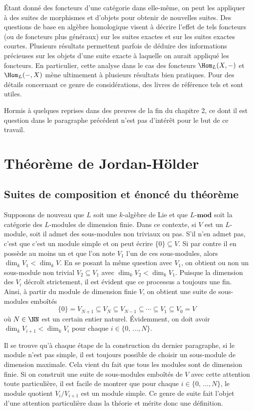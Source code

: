 Étant donné des foncteurs d'une catégorie dans elle-même, on peut les appliquer à des suites de morphismes et d'objets pour obtenir de nouvelles suites. Des questions de base en algèbre homologique visent à décrire l'effet de tels foncteurs (ou de foncteurs plus généraux) sur les suites exactes et sur les suites exactes courtes. Plusieurs résultats permettent parfois de déduire des informations précieuses sur les objets d'une suite exacte à laquelle on aurait appliqué les foncteurs. En particulier, cette analyse dans le cas des foncteurs $\Hom_L(X,-)$ et $\Hom_L(-,X)$ mène ultimement à plusieurs résultats bien pratiques. Pour des détails concernant ce genre de considérations, des livres de référence tels \cite{Rotman} et \cite{Weibel} sont utiles. 

Hormis à quelques reprises dans des preuves de la fin du chapitre 2, ce dont il est question dans le paragraphe précédent n'est pas d'intérêt pour le but de ce travail. 




\section{Théorème de Jordan-Hölder}
%
\subsection{Suites de composition et énoncé du théorème}

Supposons de nouveau que $L$ soit une $k$-algèbre de Lie et que $L$-$\mathbf{mod}$ soit la catégorie des $L$-modules de dimension finie. Dans ce contexte, si $V$ est un $L$-module, soit il admet des sous-modules non triviaux ou pas. S'il n'en admet pas, c'est que c'est un module simple et on peut écrire $\{0\} \subseteq V$. Si par contre il en possède au moins un et que l'on note $V_1$ l'un de ces sous-modules, alors $\dim_k V_1 < \dim_k V$. En se posant la même question avec $V_1$, on obtient ou non un sous-module non trivial $V_2 \subseteq V_1$ avec $\dim_k V_2 < \dim_k V_1$. Puisque la dimension des $V_i$ décroît strictement, il est évident que ce processus a toujours une fin. Ainsi, à partir du module de dimension finie $V$, on obtient une suite de sous-modules emboîtés
$$ \{0\} = V_{N+1} \subseteq V_N \subseteq V_{N-1} \subseteq \cdots \subseteq V_1 \subseteq V_0 = V $$
où $N \in \NN$ est un certain entier naturel. Évidemment, on doit avoir $\dim_k V_{i+1} < \dim_k V_i$ pour chaque $i \in \{0,\,..., N\}$.

Il se trouve qu'à chaque étape de la construction du dernier paragraphe, si le module n'est pas simple, il est toujours possible de choisir un sous-module de dimension maximale. Cela vient du fait que tous les modules sont de dimension finie. Si on construit une suite de sous-modules emboîtés de $V$ avec cette attention toute particulière, il est facile de montrer que pour chaque $i \in \{0,\,...,N\}$, le module quotient $V_i/V_{i+1}$ est un module simple. Ce genre de suite fait l'objet d'une attention particulière dans la théorie et mérite donc une définition.

